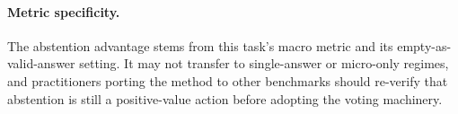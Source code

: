\paragraph{Metric specificity.}
The abstention advantage stems from this task's macro metric and its
empty-as-valid-answer setting. It may not transfer to single-answer or micro-only
regimes, and practitioners porting the method to other benchmarks should re-verify
that abstention is still a positive-value action before adopting the voting
machinery.
